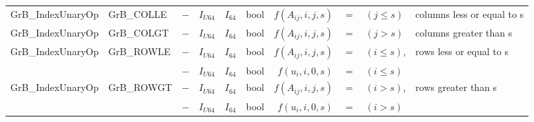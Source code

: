 \begin{landscape}
\begin{table}
\begin{threeparttable}
{\begin{tabular}{l|l|cccc|rcll}
{\sf GrB\_IndexUnaryOp}   & {\sf GrB\_COLLE}   			& $-$ 	& $I_{U64}$ 	& $I_{64}$ 	& {\sf bool} 	& $f(A_{ij},i,j,s)$ & $=$ & $(j \leq s)$ 	& columns less or equal to s \\
{\sf GrB\_IndexUnaryOp}   & {\sf GrB\_COLGT}   			& $-$ 	& $I_{U64}$ 	& $I_{64}$ 	& {\sf bool} 	& $f(A_{ij},i,j,s)$ & $=$ & $(j >    s)$ 	& columns greater than s \\
{\sf GrB\_IndexUnaryOp}   & {\sf GrB\_ROWLE}   			& $-$ 	& $I_{U64}$ 	& $I_{64}$ 	& {\sf bool} 	& $f(A_{ij},i,j,s)$ & $=$ & $(i \leq s)$, 	& rows less or equal to s \\
                          &                    			& $-$ 	& $I_{U64}$ 	& $I_{64}$ 	& {\sf bool} 	& $f(u_{i}, i,0,s)$ & $=$ & $(i \leq s)$  \\
{\sf GrB\_IndexUnaryOp}   & {\sf GrB\_ROWGT}   			& $-$ 	& $I_{U64}$ 	& $I_{64}$ 	& {\sf bool} 	& $f(A_{ij},i,j,s)$ & $=$ & $(i >    s)$, 	& rows greater than s \\
                          &                    			& $-$ 	& $I_{U64}$ 	& $I_{64}$ 	& {\sf bool} 	& $f(u_{i}, i,0,s)$ & $=$ & $(i >    s)$ \\
\hline
                     

\end{tabular}}
\end{threeparttable}
\end{table}
\end{landscape}
